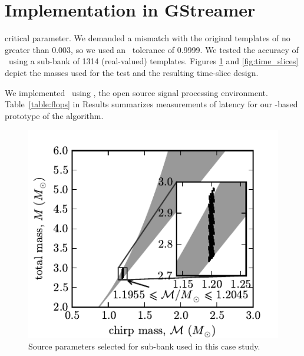 \documentclass[portrait,plainboxedsections]{sciposter}
\begin{document}
\hspace{0.05\textwidth}%
\begin{minipage}[t]{0.25\textwidth}

\section*{Implementation in GStreamer}

 critical parameter.  We demanded a mismatch with the original templates of no greater than 0.003, so we used an \SVD\ tolerance of 0.9999.  We tested the accuracy
of \lloid\ using a sub-bank of 1314 (real-valued) templates.  Figures
\ref{fig:tmpltbank} and \ref{fig:time_slices}
depict the masses used for the test and the resulting time-slice design.

{\setlength{\parindent}{1em}
We implemented \lloid\ using \gstreamer, the open source signal processing environment.  Table~\ref{table:flops} in Results summarizes measurements of
latency for our \gstreamer{}-based prototype of the \lloid{} algorithm.
}

\begin{figure}[h]
	\includegraphics[width=1.1\textwidth]{figures/tmpltbank}
	\caption{\label{fig:tmpltbank}Source parameters selected for sub-bank used in this
case study.}
\end{figure}


\end{minipage}
\end{document}
